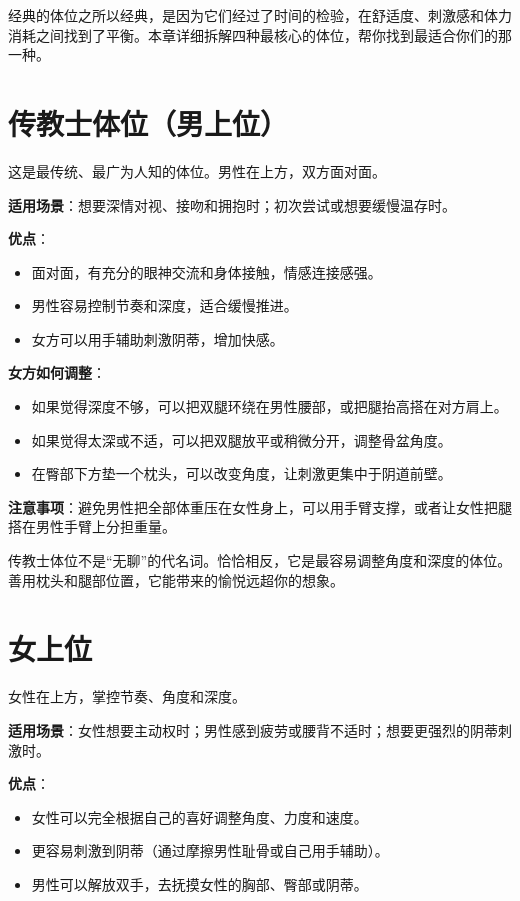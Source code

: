 \documentclass[12pt,UTF8]{ctexbook}
\begin{document}
经典的体位之所以经典，是因为它们经过了时间的检验，在舒适度、刺激感和体力消耗之间找到了平衡。本章详细拆解四种最核心的体位，帮你找到最适合你们的那一种。

\section{传教士体位（男上位）}

这是最传统、最广为人知的体位。男性在上方，双方面对面。

\textbf{适用场景}：想要深情对视、接吻和拥抱时；初次尝试或想要缓慢温存时。

\textbf{优点}：
\begin{itemize}
\item 面对面，有充分的眼神交流和身体接触，情感连接感强。
\item 男性容易控制节奏和深度，适合缓慢推进。
\item 女方可以用手辅助刺激阴蒂，增加快感。
\end{itemize}

\textbf{女方如何调整}：
\begin{itemize}
\item 如果觉得深度不够，可以把双腿环绕在男性腰部，或把腿抬高搭在对方肩上。
\item 如果觉得太深或不适，可以把双腿放平或稍微分开，调整骨盆角度。
\item 在臀部下方垫一个枕头，可以改变角度，让刺激更集中于阴道前壁。
\end{itemize}

\textbf{注意事项}：避免男性把全部体重压在女性身上，可以用手臂支撑，或者让女性把腿搭在男性手臂上分担重量。

\begin{tcolorbox}[colback=pink!5!white,colframe=red!50!black,title=贴心小叮咛]
传教士体位不是“无聊”的代名词。恰恰相反，它是最容易调整角度和深度的体位。善用枕头和腿部位置，它能带来的愉悦远超你的想象。
\end{tcolorbox}

\section{女上位}

女性在上方，掌控节奏、角度和深度。

\textbf{适用场景}：女性想要主动权时；男性感到疲劳或腰背不适时；想要更强烈的阴蒂刺激时。

\textbf{优点}：
\begin{itemize}
\item 女性可以完全根据自己的喜好调整角度、力度和速度。
\item 更容易刺激到阴蒂（通过摩擦男性耻骨或自己用手辅助）。
\item 男性可以解放双手，去抚摸女性的胸部、臀部或阴蒂。
\end{itemize}
\end{document}
